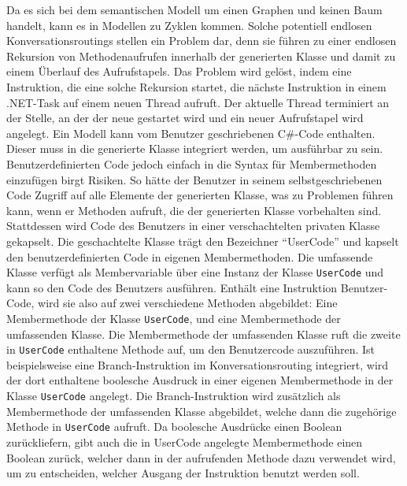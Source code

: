 \newline
Da es sich bei dem semantischen Modell um einen Graphen und keinen Baum handelt, kann es in Modellen zu Zyklen kommen. Solche potentiell endlosen Konversationsroutings stellen ein Problem dar, denn sie führen zu einer endlosen Rekursion von Methodenaufrufen innerhalb der generierten Klasse und damit zu einem Überlauf des Aufrufstapels. Das Problem wird gelöst, indem eine Instruktion, die eine solche Rekursion startet, die nächste Instruktion in einem .NET-Task auf einem neuen Thread aufruft. Der aktuelle Thread terminiert an der Stelle, an der der neue gestartet wird und ein neuer Aufrufstapel wird angelegt.
\newline
Ein Modell kann vom Benutzer geschriebenen C\#-Code enthalten. Dieser muss in die generierte Klasse integriert werden, um ausführbar zu sein. Benutzerdefinierten Code jedoch einfach in die Syntax für Membermethoden einzufügen birgt Risiken. So hätte der Benutzer in seinem selbstgeschriebenen Code Zugriff auf alle Elemente der generierten Klasse, was zu Problemen führen kann, wenn er Methoden aufruft, die der generierten Klasse vorbehalten sind. Stattdessen wird Code des Benutzers in einer verschachtelten privaten Klasse gekapselt. Die geschachtelte Klasse trägt den Bezeichner ``UserCode'' und kapselt den benutzerdefinierten Code in eigenen Membermethoden. Die umfassende Klasse verfügt als Membervariable über eine Instanz der Klasse \texttt{UserCode} und kann so den Code des Benutzers ausführen.  Enthält eine Instruktion Benutzer-Code, wird sie also auf zwei verschiedene Methoden abgebildet: Eine Membermethode der Klasse \texttt{UserCode}, und eine Membermethode der umfassenden Klasse. Die Membermethode der umfassenden Klasse ruft die zweite in \texttt{UserCode} enthaltene Methode auf, um den Benutzercode auszuführen. Ist beispielsweise eine Branch-Instruktion im Konversationsrouting integriert, wird der dort enthaltene boolesche Ausdruck in einer eigenen Membermethode in der Klasse \texttt{UserCode} angelegt. Die Branch-Instruktion wird zusätzlich als Membermethode der umfassenden Klasse abgebildet, welche dann die zugehörige Methode in \texttt{UserCode} aufruft. Da boolesche Ausdrücke einen Boolean zurückliefern, gibt auch die in UserCode angelegte Membermethode einen Boolean zurück, welcher dann in der aufrufenden Methode dazu verwendet wird, um zu entscheiden, welcher Ausgang der Instruktion benutzt werden soll.
\newline
